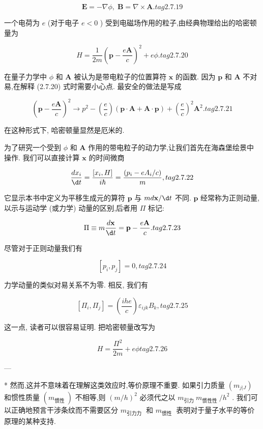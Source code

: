 \documentclass[lang=cn,newtx,10pt,scheme=chinese,thmcnt=section]{elegantbook}
\begin{document}
$$
\mathbf{E} = - \nabla \phi ,\;\mathbf{B} = \nabla \times \mathbf{A}. tag{2. 7.19}
$$

一个电荷为 $e$ (对于电子 $e < 0$ ) 受到电磁场作用的粒子,由经典物理给出的哈密顿量为

$$
H = \frac{1}{2m}{\left( \mathbf{p} - \frac{e\mathbf{A}}{c}\right) }^{2} + {e\phi }. tag{2. 7.20}
$$

在量子力学中 $\phi$ 和 $\mathbf{A}$ 被认为是带电粒子的位置算符 $\mathbf{x}$ 的函数. 因为 $\mathbf{p}$ 和 $\mathbf{A}$ 不对易,在解释 (2.7.20) 式时需要小心点. 最安全的做法是写成

$$
{\left( \mathbf{p} - \frac{e\mathbf{A}}{c}\right) }^{2} \rightarrow {p}^{2} - \left( \frac{e}{c}\right) \left( {\mathbf{p} \cdot \mathbf{A} + \mathbf{A} \cdot \mathbf{p}}\right) + {\left( \frac{e}{c}\right) }^{2}{\mathbf{A}}^{2}. tag{2. 7.21}
$$

在这种形式下, 哈密顿量显然是厄米的.

为了研究一个受到 $\phi$ 和 $\mathbf{A}$ 作用的带电粒子的动力学,让我们首先在海森堡绘景中操作. 我们可以直接计算 $\mathbf{x}$ 的时间微商

$$
\frac{d{x}_{i}}{\d t} = \frac{\left\lbrack {x}_{i}, H\right\rbrack }{i\hbar } = \frac{\left( {p}_{i} - e{A}_{i}/c\right) }{m}, tag{2.7.22}
$$

它显示本书中定义为平移生成元的算符 $\mathbf{p}$ 与 ${md}\mathbf{x}/{\d t}$ 不同. $\mathbf{p}$ 经常称为正则动量,以示与运动学 (或力学) 动量的区别,后者用 $\Pi$ 标记:

$$
\Pi \equiv m\frac{d\mathbf{x}}{\d t} = \mathbf{p} - \frac{e\mathbf{A}}{c}. tag{2.7.23}
$$

尽管对于正则动量我们有

$$
\left\lbrack {{p}_{i},{p}_{j}}\right\rbrack = 0, tag{2. 7.24}
$$

力学动量的类似对易关系不为零. 相反, 我们有

$$
\left\lbrack {{\Pi }_{i},{\Pi }_{j}}\right\rbrack = \left( \frac{ihe}{c}\right) {\varepsilon }_{ijk}{B}_{k}, tag{2.7.25}
$$

这一点, 读者可以很容易证明. 把哈密顿量改写为

$$
H = \frac{{\Pi }^{2}}{2m} + {e\phi } tag{2. 7.26}
$$

---

* 然而,这并不意味着在理解这类效应时,等价原理不重要. 如果引力质量 $\left( {m}_{j | J}\right)$ 和惯性质量 $\left( {m}_{\text{惯性 }}\right)$ 不相等,则 ${\left( m/h\right) }^{2}$ 必须代之以 ${m}_{\text{引力 }}{m}_{\text{惯性性 }}/{h}^{2}$ . 我们可以正确地预言干涉条纹而不需要区分 ${m}_{\text{引力力 }}$ 和 ${m}_{\text{惯性 }}$ 表明对于量子水平的等价原理的某种支持.
\end{document}
